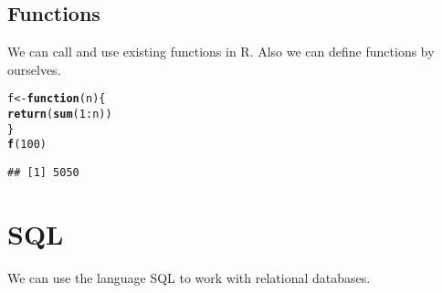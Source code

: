 \documentclass[12pt]{article}\usepackage[]{graphicx}\usepackage[]{color}
\makeatletter
\newcommand{\hlnum}[1]{\textcolor[rgb]{0.686,0.059,0.569}{#1}}%
\newcommand{\hlopt}[1]{\textcolor[rgb]{0,0,0}{#1}}%
\newcommand{\hlstd}[1]{\textcolor[rgb]{0.345,0.345,0.345}{#1}}%
\newcommand{\hlkwa}[1]{\textcolor[rgb]{0.161,0.373,0.58}{\textbf{#1}}}%
\newcommand{\hlkwb}[1]{\textcolor[rgb]{0.69,0.353,0.396}{#1}}%
\newcommand{\hlkwc}[1]{\textcolor[rgb]{0.333,0.667,0.333}{#1}}%
\newcommand{\hlkwd}[1]{\textcolor[rgb]{0.737,0.353,0.396}{\textbf{#1}}}%
\newenvironment{kframe}{%
 \def\at@end@of@kframe{}%
 \ifinner\ifhmode%
  \def\at@end@of@kframe{\end{minipage}}%
  \begin{minipage}{\columnwidth}%
 \fi\fi%
 \def\FrameCommand##1{\hskip\@totalleftmargin \hskip-\fboxsep
 \colorbox{shadecolor}{##1}\hskip-\fboxsep
     \hskip-\linewidth \hskip-\@totalleftmargin \hskip\columnwidth}%
 \MakeFramed {\advance\hsize-\width
   \@totalleftmargin\z@ \linewidth\hsize
   \@setminipage}}%
 {\par\unskip\endMakeFramed%
 \at@end@of@kframe}
\newenvironment{knitrout}{}{} %
\makeatother
\begin{document}
\subsection{Functions}
We can call and use existing functions in R. Also we can define functions by ourselves. 
\begin{knitrout}
\color{fgcolor}\begin{kframe}
\begin{alltt}
\hlstd{f} \hlkwb{<-} \hlkwa{function}\hlstd{(}\hlkwc{n}\hlstd{)\{}
  \hlkwd{return}\hlstd{(}\hlkwd{sum}\hlstd{(}\hlnum{1}\hlopt{:}\hlstd{n))}
\hlstd{\}}
\hlkwd{f}\hlstd{(}\hlnum{100}\hlstd{)}
\end{alltt}
\begin{verbatim}
## [1] 5050
\end{verbatim}
\end{kframe}
\end{knitrout}

\section{SQL}
We can use the language SQL to work with relational databases.
\end{document}
